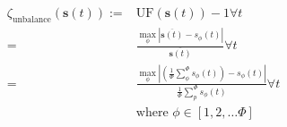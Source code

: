 \begin{equation}
	\begin{split}
		\zeta_\text{unbalance}(\textbf{s}(t)):=&\text{UF}(\textbf{s}(t)) - 1 \forall t\\
		=&\frac{\max_\phi\left|\overline{\textbf{s}(t)} - s_\phi(t)\right|}{\overline{\textbf{s}(t)}} \forall t\\
		=&\frac{\max_\phi\left|\left(\frac{1}{\Phi}\sum_\phi^\Phi{s_\phi(t)}\right) - s_\phi(t)\right|}{\frac{1}{\Phi}\sum_p^\Phi{s_\phi(t)}} \forall t\\
		&\text{where } \phi \in [1, 2, \dots \Phi]
	\end{split}
	\label{ch1:equ:unbalance-cost}
\end{equation}
